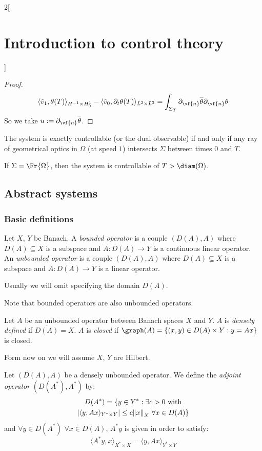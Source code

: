 \documentclass[../../../main_math.tex]{subfiles}
\begin{document}
\begin{multicols}{2}[\section{Introduction to control theory}]
\begin{proof}
    $$
      \langle \hat{v}_1,\theta(T)\rangle_{H^{-1}\times H_0^1}-\langle \hat{v}_0,\partial_t\theta(T)\rangle_{L^2\times L^2}=\int_{\Sigma_T}\partial_{\vf{n}}\overline{\theta}\partial_{\vf{n}}\theta
    $$
    So we take $u:=\partial_{\vf{n}}\overline{\theta}$.
  \end{proof}
  \begin{theorem}
    The system is exactly controllable (or the dual observable) if and only if any ray of geometrical optics in $\Omega$ (at speed $1$) intersects $\Sigma$ between times $0$ and $T$.
  \end{theorem}
  \begin{remark}
    If $\Sigma=\Fr{\Omega}$, then the system is controllable of $T>\diam(\Omega)$.
  \end{remark}
  \subsection{Abstract systems}
  \subsubsection{Basic definitions}
  \begin{definition}
    Let $X$, $Y$ be Banach. A \emph{bounded operator} is a couple $(D(A), A)$ where $D(A)\subseteq X$ is a subspace and $A:D(A)\to Y$ is a continuous linear operator. An \emph{unbounded operator} is a couple $(D(A), A)$ where $D(A)\subseteq X$ is a subspace and $A:D(A)\to Y$ is a linear operator.
  \end{definition}
  \begin{remark}
    Usually we will omit specifying the domain $D(A)$.
  \end{remark}
  \begin{remark}
    Note that bounded operators are also unbounded operators.
  \end{remark}
  \begin{definition}
    Let $A$ be an unbounded operator between Banach spaces $X$ and $Y$. $A$ is \emph{densely defined} if $\overline{D(A)}=X$. $A$ is \emph{closed} if $\graph(A)=\{(x,y)\in D(A)\times Y:y=Ax\}$ is closed.
  \end{definition}
  Form now on we will assume $X$, $Y$ are Hilbert.
  \begin{definition}
    Let $(D(A),A)$ be a densely unbounded operator. We define the \emph{adjoint operator} $(D(A^*),A^*)$ by:
    \begin{multline*}
      D(A^*)=\{y\in Y^*:\exists c>0\text{ with}\\
      \abs{\langle y,Ax\rangle_{Y^*\times Y}}\leq c \norm{x}_X\ \forall x\in D(A)\}
    \end{multline*}
    and $\forall y\in D(A^*)$ $\forall x\in D(A)$, $A^*y$ is given in order to satisfy:
    $$
      \langle A^*y,x\rangle_{X^*\times X}=\langle y,Ax\rangle_{Y^*\times Y}
    $$
  \end{definition}

\end{multicols}
\end{document}
